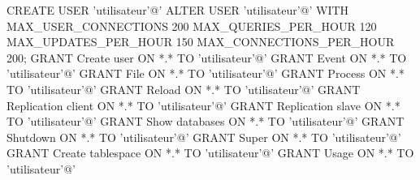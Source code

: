 CREATE USER 'utilisateur'@'%
ALTER USER 'utilisateur'@'%
WITH
	MAX_USER_CONNECTIONS 200
	MAX_QUERIES_PER_HOUR 120
	MAX_UPDATES_PER_HOUR 150
	MAX_CONNECTIONS_PER_HOUR 200;
GRANT Create user ON *.* TO 'utilisateur'@'%
GRANT Event ON *.* TO 'utilisateur'@'%
GRANT File ON *.* TO 'utilisateur'@'%
GRANT Process ON *.* TO 'utilisateur'@'%
GRANT Reload ON *.* TO 'utilisateur'@'%
GRANT Replication client ON *.* TO 'utilisateur'@'%
GRANT Replication slave ON *.* TO 'utilisateur'@'%
GRANT Show databases ON *.* TO 'utilisateur'@'%
GRANT Shutdown ON *.* TO 'utilisateur'@'%
GRANT Super ON *.* TO 'utilisateur'@'%
GRANT Create tablespace ON *.* TO 'utilisateur'@'%
GRANT Usage ON *.* TO 'utilisateur'@'%
